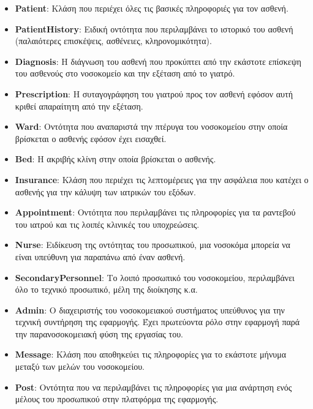 \documentclass{article}
\begin{document}
\begin{itemize}
    \item \textbf{Patient}: Κλάση που περιέχει όλες τις βασικές πληροφοριές για τον ασθενή.
    \item \textbf{PatientHistory}: Ειδική οντότητα που περιλαμβάνει το ιστορικό του ασθενή (παλαιότερες επισκέψεις, ασθένειες, κληρονομικότητα).
    \item \textbf{Diagnosis}: Η διάγνωση του ασθενή που προκύπτει από την εκάστοτε επίσκεψη του ασθενούς στο νοσοκομείο και την εξέταση από το γιατρό.
    \item \textbf{Prescription}: Η συταγογράφηση του γιατρού προς τον ασθενή εφόσον αυτή κριθεί απαραίτητη από την εξέταση.
    \item \textbf{Ward}: Οντότητα που αναπαριστά την πτέρυγα του νοσοκομείου στην οποία βρίσκεται ο ασθενής εφόσον έχει εισαχθεί.
    \item \textbf{Bed}: Η ακριβής κλίνη στην οποία βρίσκεται ο ασθενής.
    \item \textbf{Insurance}: Κλάση που περιέχει τις λεπτομέρειες για την ασφάλεια που κατέχει ο ασθενής για την κάλυψη των ιατρικών του εξόδων.
    \item \textbf{Appointment}: Οντότητα που περιλαμβάνει τις πληροφορίες για τα ραντεβού του ιατρού και τις λοιπές κλινικές του υποχρεώσεις.
    \item \textbf{Nurse}: Ειδίκευση της οντότητας του προσωπικού, μια νοσοκόμα μπορεία να είναι υπεύθυνη για παραπάνω από έναν ασθενή.
    \item \textbf{SecondaryPersonnel}: Το λοιπό προσωπικό του νοσοκομείου, περιλαμβάνει όλο το τεχνικό προσωπικό, μέλη της διοίκησης κ.α.
    \item\textbf{Admin}: Ο διαχειριστής του νοσοκομειακού συστήματος υπεύθυνος για την τεχνική συντήρηση της εφαρμογής. Έχει πρωτεύοντα ρόλο στην εφαρμογή παρά την παρανοσοκομειακή φύση της εργασίας του.
    \item\textbf{Message}: Κλάση που αποθηκεύει τις πληροφορίες για το εκάστοτε μήνυμα μεταξύ των μελών του νοσοκομείου.
    \item\textbf{Post}: Οντότητα που να περιλαμβάνει τις πληροφορίες για μια ανάρτηση ενός μέλους του προσωπικού στην πλατφόρμα της εφαρμογής.
\end{itemize}
\end{document}
